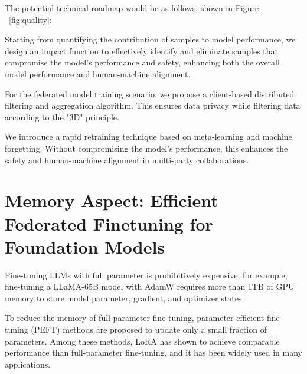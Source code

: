 \documentclass[withindex,glossary,firstyr]{cam-thesis}
\begin{document}
The potential technical roadmap would be as follows, shown in Figure ~\ref{fig:quality}:

Starting from quantifying the contribution of samples to model performance, we design an impact function to effectively identify and eliminate samples that compromise the model's performance and safety, enhancing both the overall model performance and human-machine alignment.

For the federated model training scenario, we propose a client-based distributed filtering and aggregation algorithm. This ensures data privacy while filtering data according to the "3D" principle.

We introduce a rapid retraining technique based on meta-learning and machine forgetting. Without compromising the model's performance, this enhances the safety and human-machine alignment in multi-party collaborations.




\section{Memory Aspect: Efficient Federated Finetuning for Foundation Models}





Fine-tuning LLMs with full parameter is prohibitively expensive, for example, fine-tuning a LLaMA-65B model with AdamW requires more than 1TB of GPU memory to store model parameter, gradient, and optimizer states.

To reduce the memory of full-parameter fine-tuning, parameter-efficient fine-tuning (PEFT) methods are proposed to update only a small fraction of parameters. Among these methods, LoRA has shown to achieve comparable performance than full-parameter fine-tuning, and it has been widely used in many applications.
\end{document}
